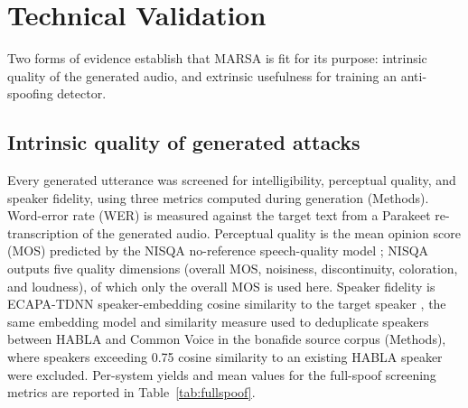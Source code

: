 \documentclass[11pt]{article}
\begin{document}
\section*{Technical Validation}

Two forms of evidence establish that MARSA is fit for its purpose:
intrinsic quality of the generated audio, and extrinsic usefulness for
training an anti-spoofing detector.

\subsection*{Intrinsic quality of generated attacks}

Every generated utterance was screened for intelligibility, perceptual
quality, and speaker fidelity, using three metrics computed during
generation (Methods). Word-error rate (WER) is measured against the
target text from a Parakeet re-transcription of the generated audio.
Perceptual quality is the mean opinion score (MOS) predicted by the
NISQA no-reference speech-quality model \citep{nisqa}; NISQA outputs
five quality dimensions (overall MOS, noisiness, discontinuity,
coloration, and loudness), of which only the overall MOS is used here.
Speaker fidelity is ECAPA-TDNN speaker-embedding cosine similarity to
the target speaker \citep{ecapa}, the same embedding model and
similarity measure used to deduplicate speakers between HABLA and Common
Voice in the bonafide source corpus (Methods), where speakers exceeding
0.75 cosine similarity to an existing HABLA speaker were excluded.
Per-system yields and mean values for the full-spoof screening metrics
are reported in Table~\ref{tab:fullspoof}.
\end{document}
